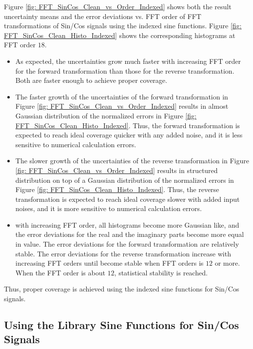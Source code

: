 \documentclass[twoside]{article}
\numberwithin{equation}{section}
\begin{document}
Figure \ref{fig: FFT_SinCos_Clean_vs_Order_Indexed} shows both the result uncertainty means and the error deviations vs. FFT order of FFT transformations of Sin/Cos signals using the indexed sine functions.
Figure \ref{fig: FFT_SinCos_Clean_Histo_Indexed} shows the corresponding histograms at FFT order $18$.
\begin{itemize}
\item As expected, the uncertainties grow much faster with increasing FFT order for the forward transformation than those for the reverse transformation.
Both are faster enough to achieve proper coverage. 

\item The faster growth of the uncertainties of the forward transformation in Figure \ref{fig: FFT_SinCos_Clean_vs_Order_Indexed} results in almost Gaussian distribution of the normalized errors in Figure \ref{fig: FFT_SinCos_Clean_Histo_Indexed}.
Thus, the forward transformation is expected to reach ideal coverage quicker with any added noise, and it is less sensitive to numerical calculation errors.

\item The slower growth of the uncertainties of the reverse transformation in Figure \ref{fig: FFT_SinCos_Clean_vs_Order_Indexed} results in structured distribution on top of a Gaussian distribution of the normalized errors in Figure \ref{fig: FFT_SinCos_Clean_Histo_Indexed}.
Thus, the reverse transformation is expected to reach ideal coverage slower with added input noises, and it is more sensitive to numerical calculation errors.

\item with increasing FFT order, all histograms become more Gaussian like, and the error deviations for the real and the imaginary parts become more equal in value.
The error deviations for the forward transformation are relatively stable.
The error deviations for the reverse transformation increase with increasing FFT orders until become stable when FFT orders is $12$ or more.
When the FFT order is about $12$, statistical stability is reached.
 
\end{itemize}

Thus, proper coverage is achieved using the indexed sine functions for Sin/Cos signals.


\subsection{Using the Library Sine Functions for Sin/Cos Signals}
\end{document}
